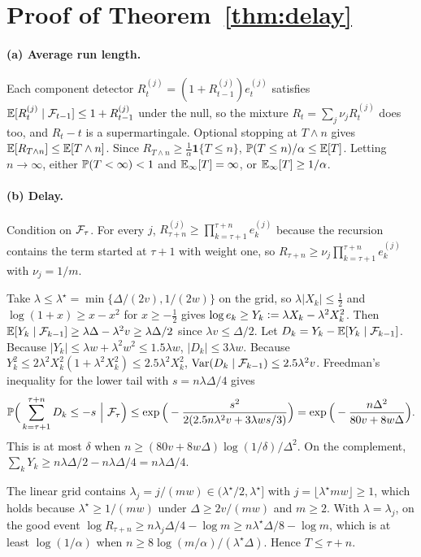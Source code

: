 \section{Proof of Theorem~\ref{thm:delay}}\label{app:delay}

\paragraph{(a) Average run length.} Each component detector $R^{(j)}_t=(1+R^{(j)}_{t-1})e^{(j)}_t$ satisfies $\mathbb{E}[R^{(j)}_t\mid\mathcal{F}_{t-1}]\le1+R^{(j)}_{t-1}$ under the null,
so the mixture $R_t=\sum_j\nu_jR^{(j)}_t$ does too, and $R_t-t$ is a supermartingale. Optional stopping at $T\wedge n$ gives $\mathbb{E}[R_{T\wedge n}]\le\mathbb{E}[T\wedge n]$. Since $R_{T\wedge n}\ge\frac1\alpha\mathbf 1\{T\le n\}$,
$\mathbb{P}(T\le n)/\alpha\le\mathbb{E}[T]$. Letting $n\to\infty$, either $\mathbb{P}(T<\infty)<1$ and $\mathbb{E}_\infty[T]=\infty$, or $\mathbb{E}_\infty[T]\ge1/\alpha$.

\paragraph{(b) Delay.} Condition on $\mathcal{F}_\tau$. For every $j$, $R^{(j)}_{\tau+n}\ge\prod_{k=\tau+1}^{\tau+n}e^{(j)}_k$ because the
recursion contains the term started at $\tau{+}1$ with weight one, so $R_{\tau+n}\ge\nu_j\prod_{k=\tau+1}^{\tau+n}e^{(j)}_k$ with $\nu_j=1/m$.

Take $\lambda\le\lambda^\star=\min\{\Delta/(2v),1/(2w)\}$ on the grid, so $\lambda|X_k|\le\frac12$ and $\log(1+x)\ge x-x^2$ for $x\ge-\frac12$ gives
$\log e_k\ge Y_k\vcentcolon=\lambda X_k-\lambda^2X_k^2$. Then $\mathbb{E}[Y_k\mid\mathcal{F}_{k-1}]\ge\lambda\Delta-\lambda^2v\ge\lambda\Delta/2$ since $\lambda v\le\Delta/2$.
Let $D_k=Y_k-\mathbb{E}[Y_k\mid\mathcal{F}_{k-1}]$. Because $|Y_k|\le\lambda w+\lambda^2w^2\le1.5\lambda w$, $|D_k|\le3\lambda w$. Because $Y_k^2\le2\lambda^2X_k^2(1+\lambda^2X_k^2)\le2.5\lambda^2X_k^2$,
$\mathrm{Var}(D_k\mid\mathcal{F}_{k-1})\le2.5\lambda^2v$. Freedman's inequality \citep{freedman1975tail} for the lower tail with $s=n\lambda\Delta/4$ gives
\[
\PR\Big(\sum_{k=\tau+1}^{\tau+n}D_k\le-s\ \Big|\ \Fcal_\tau\Big)\le\exp\Big(-\frac{s^2}{2(2.5n\lambda^2v+3\lambda ws/3)}\Big)=\exp\Big(-\frac{n\Delta^2}{80v+8w\Delta}\Big).
\]
This is at most $\delta$ when $n\ge(80v+8w\Delta)\log(1/\delta)/\Delta^2$. On the complement, $\sum_kY_k\ge n\lambda\Delta/2-n\lambda\Delta/4=n\lambda\Delta/4$.

The linear grid contains $\lambda_j=j/(mw)\in(\lambda^\star/2,\lambda^\star]$ with $j=\lfloor\lambda^\star mw\rfloor\ge1$, which holds because $\lambda^\star\ge1/(mw)$ under $\Delta\ge2v/(mw)$ and $m\ge2$.
With $\lambda=\lambda_j$, on the good event $\log R_{\tau+n}\ge n\lambda_j\Delta/4-\log m\ge n\lambda^\star\Delta/8-\log m$, which is at least $\log(1/\alpha)$ when $n\ge8\log(m/\alpha)/(\lambda^\star\Delta)$. Hence $T\le\tau+n$.

